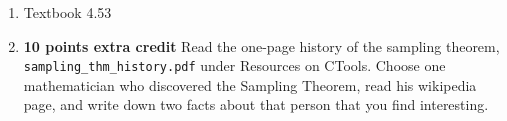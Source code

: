 \documentclass[draft]{siamltex}
\begin{document}
\begin{enumerate}
\vspace{5mm} 
\item Textbook 4.53 %

 
\vspace{5mm}
\item \textbf{10 points extra credit}  Read the one-page history of the sampling theorem, \texttt{sampling\_thm\_history.pdf} under Resources on CTools. Choose one mathematician who discovered the Sampling Theorem, read his wikipedia page, and write down two facts about that person that you find interesting. 

\end{enumerate}

%
%
%
%
%
%
%
\end{document}
